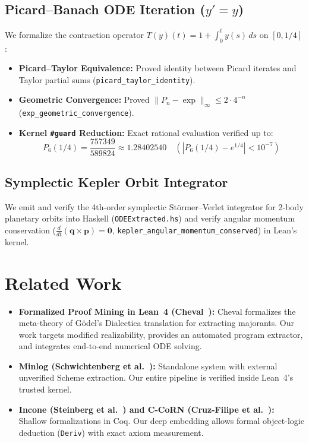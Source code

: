 \documentclass[11pt,a4paper]{article}
\theoremstyle{definition}
\theoremstyle{remark}
\begin{document}
\subsection{Picard--Banach ODE Iteration ($y' = y$)}
We formalize the contraction operator $T(y)(t) = 1 + \int_0^t y(s) \, ds$ on $[0, 1/4]$:
\begin{itemize}
    \item \textbf{Picard--Taylor Equivalence:} Proved identity between Picard iterates and Taylor partial sums (\texttt{picard\_taylor\_identity}).
    \item \textbf{Geometric Convergence:} Proved $\|P_n - \exp\|_\infty \le 2 \cdot 4^{-n}$ (\texttt{exp\_geometric\_convergence}).
    \item \textbf{Kernel \texttt{\#guard} Reduction:} Exact rational evaluation verified up to:
    \[
    P_6(1/4) = \frac{757349}{589824} \approx 1.28402540 \quad (|P_6(1/4) - e^{1/4}| < 10^{-7})
    \]
\end{itemize}

\subsection{Symplectic Kepler Orbit Integrator}
We emit and verify the 4th-order symplectic St\"ormer--Verlet integrator for 2-body planetary orbits into Haskell (\texttt{ODEExtracted.hs}) and verify angular momentum conservation ($\frac{d}{dt}(\mathbf{q} \times \mathbf{p}) = \mathbf{0}$, \texttt{kepler\_angular\_momentum\_conserved}) in Lean's kernel.

\section{Related Work}

\begin{itemize}
    \item \textbf{Formalized Proof Mining in Lean~4 (Cheval~\cite{cheval2023}):} Cheval formalizes the meta-theory of G\"odel's Dialectica translation for extracting majorants. Our work targets modified realizability, provides an automated program extractor, and integrates end-to-end numerical ODE solving.
    \item \textbf{Minlog (Schwichtenberg et al.~\cite{schwichtenberg2012,berger1998}):} Standalone system with external unverified Scheme extraction. Our entire pipeline is verified inside Lean~4's trusted kernel.
    \item \textbf{Incone (Steinberg et al.~\cite{steinberg2022}) and C-CoRN (Cruz-Filipe et al.~\cite{cruzfilipe2004}):} Shallow formalizations in Coq. Our deep embedding allows formal object-logic deduction (\texttt{Deriv}) with exact axiom measurement.
\end{itemize}
\end{document}
